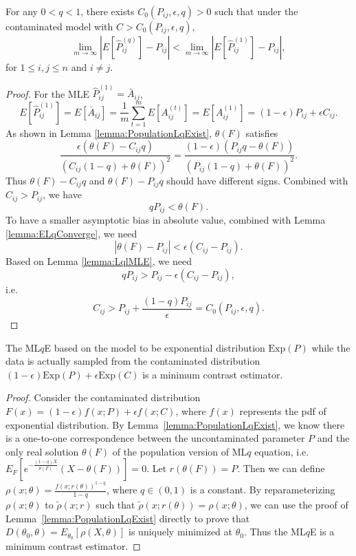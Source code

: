 \begin{lemma}
\label{lemma:ELqlEMLEproof}
For any $0 < q < 1$, there exists $C_0(P_{ij}, \epsilon, q) > 0$ such that under the contaminated model with $C > C_0(P_{ij}, \epsilon, q)$,
\[
	\lim_{m \to \infty} \left| E[\hat{P}^{(q)}_{ij}] - P_{ij} \right| < 
    \lim_{m \to \infty} \left| E[\hat{P}^{(1)}_{ij}] - P_{ij} \right|,
\]
for $1 \le i, j \le n$ and $i \ne j$.
\end{lemma}
\begin{proof}
For the MLE $\hat{P}^{(1)}_{ij} = \bar{A}_{ij}$,
\[
	E[\hat{P}^{(1)}_{ij}] = E[\bar{A}_{ij}]
    = \frac{1}{m} \sum_{t = 1}^m E[A_{ij}^{(t)}]
    = E[A_{ij}^{(1)}]
    = (1-\epsilon) P_{ij} + \epsilon C_{ij}.
\]
As shown in Lemma \ref{lemma:PopulationLqExist}, $\theta(F)$ satisfies
\[
\frac{\epsilon (\theta(F) - C_{ij}q)}{(C_{ij}(1-q) + \theta(F))^2} =
\frac{(1-\epsilon) (P_{ij} q - \theta(F))}{(P_{ij}(1-q) + \theta(F))^2}.
\]
Thus $\theta(F) - C_{ij} q$ and $\theta(F) - P_{ij} q$ should have different signs. Combined with $C_{ij} > P_{ij}$, we have
\[
q P_{ij} < \theta(F).
\]
To have a smaller asymptotic bias in absolute value, combined with Lemma \ref{lemma:ELqConverge}, we need
\[
|\theta(F) - P_{ij}| < \epsilon (C_{ij} - P_{ij}).
\]
Based on Lemma \ref{lemma:LqlMLE}, we need
\[
q P_{ij} > P_{ij} - \epsilon(C_{ij} - P_{ij}),
\]
i.e.
\[
C_{ij} > P_{ij} + \frac{(1-q) P_{ij}}{\epsilon} = C_0(P_{ij}, \epsilon, q).
\]
\end{proof}


\begin{lemma}
\label{lemma:minimumcontrast}
The ML$q$E based on the model to be exponential distribution $\mathrm{Exp}(P)$ while the data is actually sampled from the contaminated distribution $(1-\epsilon) \mathrm{Exp}(P) + \epsilon \mathrm{Exp}(C)$ is a minimum contrast estimator.
\end{lemma}
\begin{proof}
Consider the contaminated distribution $F(x) = (1-\epsilon) f(x; P) + \epsilon f(x; C)$, where $f(x)$ represents the pdf of exponential distribution. By Lemma~\ref{lemma:PopulationLqExist}, we know there is a one-to-one correspondence between the uncontaminated parameter $P$ and the only real solution $\theta(F)$ of the population version of ML$q$ equation,
i.e.\ $E_F[e^{-\frac{(1-q)X}{\theta(F)}}(X - \theta(F))] = 0$. Let $r(\theta(F)) = P$.
Then we can define $\rho(x; \theta) = \frac{f(x; r(\theta))^{1-q}}{1 - q}$, where $q \in (0, 1)$ is a constant.
By reparameterizing $\rho(x; \theta)$ to $\widetilde{\rho}(x; r)$ such that $\widetilde{\rho}(x; r(\theta)) = \rho(x; \theta)$, we can use the proof of Lemma~\ref{lemma:PopulationLqExist} directly to prove that $D(\theta_0, \theta) = E_{\theta_0}[\rho(X, \theta)]$ is uniquely minimized at $\theta_0$. Thus the ML$q$E is a minimum contrast estimator.
\end{proof}


